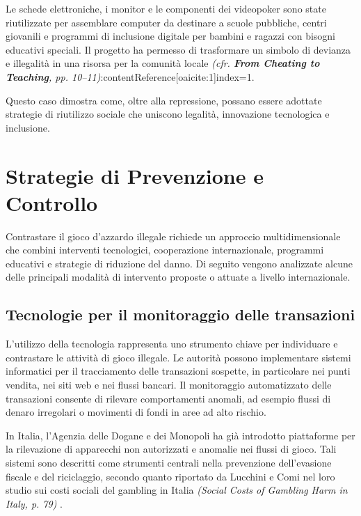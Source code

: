 \documentclass[a4paper,12pt]{article}
\begin{document}
Le schede elettroniche, i monitor e le componenti dei videopoker sono state riutilizzate per assemblare computer da destinare a scuole pubbliche, centri giovanili e programmi di inclusione digitale per bambini e ragazzi con bisogni educativi speciali. Il progetto ha permesso di trasformare un simbolo di devianza e illegalità in una risorsa per la comunità locale \textit{(cfr. \textbf{From Cheating to Teaching}, pp. 10--11)}:contentReference[oaicite:1]{index=1}.

Questo caso dimostra come, oltre alla repressione, possano essere adottate strategie di riutilizzo sociale che uniscono legalità, innovazione tecnologica e inclusione.


\section{Strategie di Prevenzione e Controllo}

Contrastare il gioco d’azzardo illegale richiede un approccio multidimensionale che combini interventi tecnologici, cooperazione internazionale, programmi educativi e strategie di riduzione del danno. Di seguito vengono analizzate alcune delle principali modalità di intervento proposte o attuate a livello internazionale.

\subsection{Tecnologie per il monitoraggio delle transazioni}

L’utilizzo della tecnologia rappresenta uno strumento chiave per individuare e contrastare le attività di gioco illegale. Le autorità possono implementare sistemi informatici per il tracciamento delle transazioni sospette, in particolare nei punti vendita, nei siti web e nei flussi bancari. Il monitoraggio automatizzato delle transazioni consente di rilevare comportamenti anomali, ad esempio flussi di denaro irregolari o movimenti di fondi in aree ad alto rischio.

In Italia, l’Agenzia delle Dogane e dei Monopoli ha già introdotto piattaforme per la rilevazione di apparecchi non autorizzati e anomalie nei flussi di gioco. Tali sistemi sono descritti come strumenti centrali nella prevenzione dell’evasione fiscale e del riciclaggio, secondo quanto riportato da Lucchini e Comi nel loro studio sui costi sociali del gambling in Italia \textit{(Social Costs of Gambling Harm in Italy, p. 79)} \cite{lucchini2022socialcosts}.
\end{document}
